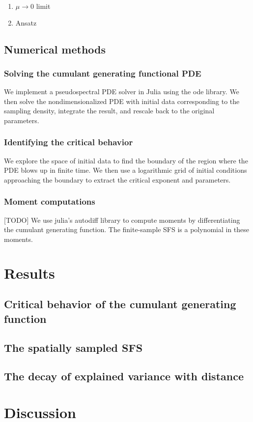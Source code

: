\documentclass{article}
\begin{document}
\begin{enumerate}
    \item $\mu \to 0$ limit
    \item Ansatz
\end{enumerate}

\subsection*{Numerical methods}

\subsubsection*{Solving the cumulant generating functional PDE}
We implement a pseudospectral PDE solver in Julia using the ode library.
We then solve the nondimensionalized PDE with initial data corresponding to the sampling density, integrate the result, and rescale back to the original parameters.

\subsubsection*{Identifying the critical behavior}
We explore the space of initial data to find the boundary of the region where the PDE blows up in finite time.
We then use a logarithmic grid of initial conditions approaching the boundary to extract the critical exponent and parameters.

\subsubsection*{Moment computations}
[TODO] We use julia's autodiff library to compute moments by differentiating the cumulant generating function.
The finite-sample SFS is a polynomial in these moments.

\section*{Results}

\subsection*{Critical behavior of the cumulant generating function}

\subsection*{The spatially sampled SFS}

\subsection*{The decay of explained variance with distance}

\section*{Discussion}
\end{document}
